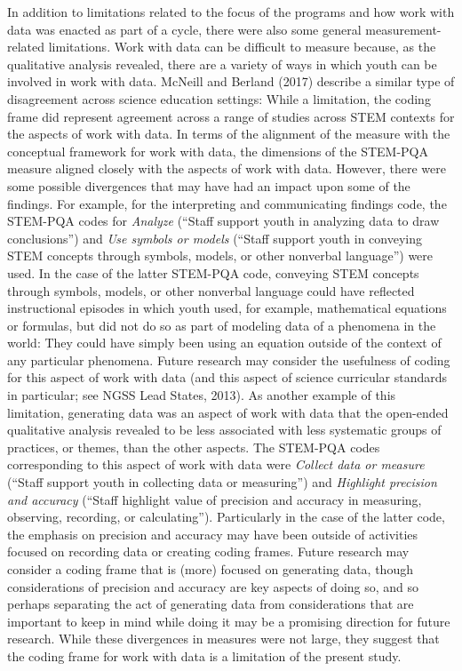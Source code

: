 \documentclass[]{msu-thesis}
\theoremstyle{definition}
\theoremstyle{definition}
\theoremstyle{definition}
\theoremstyle{remark}
\begin{document}
In addition to limitations related to the focus of the programs and how
work with data was enacted as part of a cycle, there were also some
general measurement-related limitations. Work with data can be difficult
to measure because, as the qualitative analysis revealed, there are a
variety of ways in which youth can be involved in work with data.
McNeill and Berland (2017) describe a similar type of disagreement
across science education settings: While a limitation, the coding frame
did represent agreement across a range of studies across STEM contexts
for the aspects of work with data. In terms of the alignment of the
measure with the conceptual framework for work with data, the dimensions
of the STEM-PQA measure aligned closely with the aspects of work with
data. However, there were some possible divergences that may have had an
impact upon some of the findings. For example, for the interpreting and
communicating findings code, the STEM-PQA codes for \emph{Analyze}
(``Staff support youth in analyzing data to draw conclusions'') and
\emph{Use symbols or models} (``Staff support youth in conveying STEM
concepts through symbols, models, or other nonverbal language'') were
used. In the case of the latter STEM-PQA code, conveying STEM concepts
through symbols, models, or other nonverbal language could have
reflected instructional episodes in which youth used, for example,
mathematical equations or formulas, but did not do so as part of
modeling data of a phenomena in the world: They could have simply been
using an equation outside of the context of any particular phenomena.
Future research may consider the usefulness of coding for this aspect of
work with data (and this aspect of science curricular standards in
particular; see NGSS Lead States, 2013). As another example of this
limitation, generating data was an aspect of work with data that the
open-ended qualitative analysis revealed to be less associated with less
systematic groups of practices, or themes, than the other aspects. The
STEM-PQA codes corresponding to this aspect of work with data were
\emph{Collect data or measure} (``Staff support youth in collecting data
or measuring'') and \emph{Highlight precision and accuracy} (``Staff
highlight value of precision and accuracy in measuring, observing,
recording, or calculating''). Particularly in the case of the latter
code, the emphasis on precision and accuracy may have been outside of
activities focused on recording data or creating coding frames. Future
research may consider a coding frame that is (more) focused on
generating data, though considerations of precision and accuracy are key
aspects of doing so, and so perhaps separating the act of generating
data from considerations that are important to keep in mind while doing
it may be a promising direction for future research. While these
divergences in measures were not large, they suggest that the coding
frame for work with data is a limitation of the present study.
\end{document}

